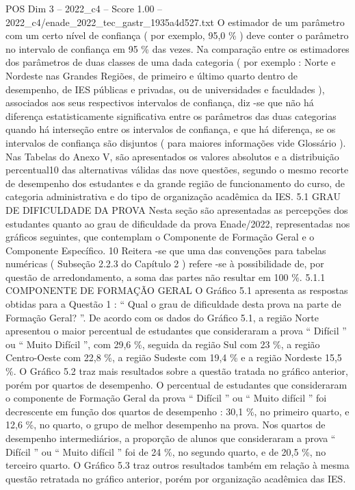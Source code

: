\begin{textsample}{POS Dim 3 – 2022\_c4 – Score 1.00 – 2022\_c4/enade\_2022\_tec\_gastr\_1935a4d527.txt}
O estimador de um parâmetro com um certo nível de confiança ( por exemplo, 95,0 \% ) deve conter o parâmetro no intervalo de confiança em 95 \% das vezes.
Na comparação entre os estimadores dos parâmetros de duas classes de uma dada categoria ( por exemplo : Norte e Nordeste nas Grandes Regiões, de primeiro e último quarto dentro de desempenho, de IES públicas e privadas, ou de universidades e faculdades ), associados aos seus respectivos intervalos de confiança, diz -se que não há diferença estatisticamente significativa entre os parâmetros das duas categorias quando há interseção entre os intervalos de confiança, e que há diferença, se os intervalos de confiança são disjuntos ( para maiores informações vide Glossário ).
Nas Tabelas do Anexo V, são apresentados os valores absolutos e a distribuição percentual10 das alternativas válidas das nove questões, segundo o mesmo recorte de desempenho dos estudantes e da grande região de funcionamento do curso, de categoria administrativa e do tipo de organização acadêmica da IES. 5.1 GRAU DE DIFICULDADE DA PROVA Nesta seção são apresentadas as percepções dos estudantes quanto ao grau de dificuldade da prova Enade/2022, representadas nos gráficos seguintes, que contemplam o Componente de Formação Geral e o Componente Específico. 10 Reitera -se que uma das convenções para tabelas numéricas ( Subseção 2.2.3 do Capítulo 2 ) refere -se à possibilidade de, por questão de arredondamento, a soma das partes não resultar em 100 \%. 5.1.1 COMPONENTE DE FORMAÇÃO GERAL O Gráfico 5.1 apresenta as respostas obtidas para a Questão 1 : “ Qual o grau de dificuldade desta prova na parte de Formação Geral? ”.
De acordo com os dados do Gráfico 5.1, a região Norte apresentou o maior percentual de estudantes que consideraram a prova “ Difícil ” ou “ Muito Difícil ”, com 29,6 \%, seguida da região Sul com 23 \%, a região Centro-Oeste com 22,8 \%, a região Sudeste com 19,4 \% e a região Nordeste 15,5 \%.
O Gráfico 5.2 traz mais resultados sobre a questão tratada no gráfico anterior, porém por quartos de desempenho.
O percentual de estudantes que consideraram o componente de Formação Geral da prova “ Difícil ” ou “ Muito difícil ” foi decrescente em função dos quartos de desempenho : 30,1 \%, no primeiro quarto, e 12,6 \%, no quarto, o grupo de melhor desempenho na prova.
Nos quartos de desempenho intermediários, a proporção de alunos que consideraram a prova “ Difícil ” ou “ Muito difícil ” foi de 24 \%, no segundo quarto, e de 20,5 \%, no terceiro quarto.
O Gráfico 5.3 traz outros resultados também em relação à mesma questão retratada no gráfico anterior, porém por organização acadêmica das IES.

\end{textsample}
